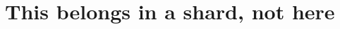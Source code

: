 \documentclass{article}
\begin{document}
\section{This belongs in a shard, not here}

\end{document}

